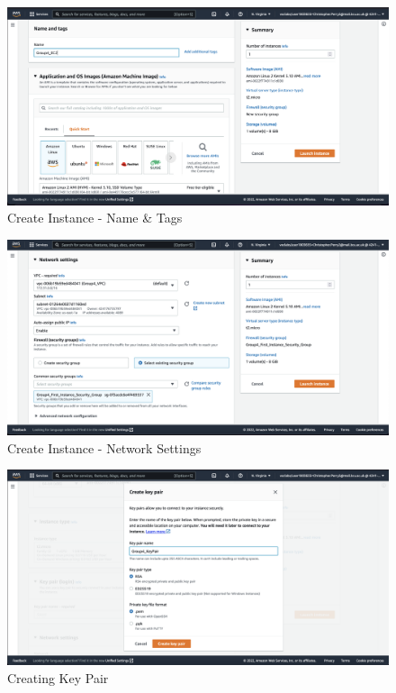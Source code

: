 \begin{figure}[H]
    \centering
        \includegraphics[width=\textwidth]{resources/ec2/create-instance-name-and-tags}
    \caption{Create Instance - Name \& Tags}
    \label{fig:create-instance-name-and-tags}
\end{figure}

\begin{figure}[H]
    \centering
        \includegraphics[width=\textwidth]{resources/ec2/create-instance-network-settings}
    \caption{Create Instance - Network Settings}
    \label{fig:create-instance-network-settings}
\end{figure}

\begin{figure}[H]
    \centering
        \includegraphics[width=\textwidth]{resources/ec2/create-key-pair}
    \caption{Creating Key Pair}
    \label{fig:create-key-pair}
\end{figure}

